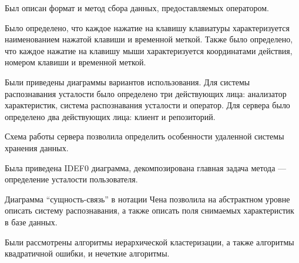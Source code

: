 Был описан формат и метод сбора данных, предоставляемых оператором.

Было определено, что каждое нажатие на клавишу клавиатуры характеризуется наименованием нажатой клавиши и временной меткой. Также было определено, что каждое нажатие на клавишу мыши характеризуется координатами действия, номером клавиши и временной меткой.

Были приведены диаграммы вариантов использования. Для системы распознавания усталости было определено три действующих лица: анализатор характеристик, система распознавания усталости и оператор. Для сервера было определено два действующих лица: клиент и репозиторий.

Схема работы сервера позволила определить особенности удаленной системы хранения данных.

Была приведена IDEF0 диаграмма, декомпозирована главная задача метода --- определение усталости пользователя.

Диаграмма ``сущность-связь'' в нотации Чена позволила на абстрактном уровне описать систему распознавания, а также описать поля снимаемых характеристик в базе данных.

Были рассмотрены алгоритмы иерархической кластеризации, а также алгоритмы квадратичной ошибки, и нечеткие алгоритмы.

\pagebreak
